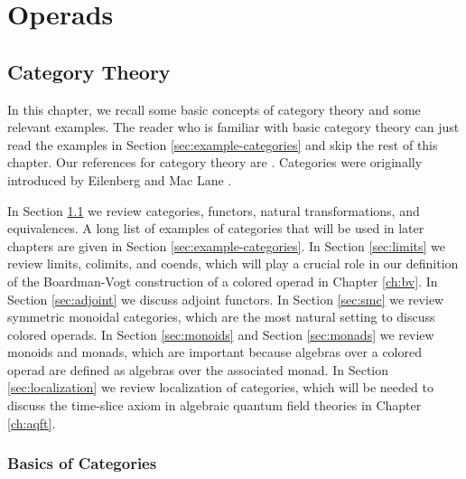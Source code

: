 \documentclass[11pt]{amsbook}
\numberwithin{section}{chapter}
\numberwithin{subsection}{section}
\numberwithin{equation}{section}
\theoremstyle{plain}
\theoremstyle{definition}
\begin{document}
\part{Operads}\label{part:operads}

\chapter{Category Theory}\label{ch:categories}

In this chapter, we recall some basic concepts of category theory and some relevant examples.  The reader who is familiar with basic category theory can just read the examples in Section \ref{sec:example-categories} and skip the rest of this chapter.  Our references for category theory are \cite{bor1,bor2,maclane}.  Categories were originally introduced by Eilenberg and Mac Lane \cite{eilenberg-maclane}.

In Section \ref{sec:categories} we review categories, functors, natural transformations, and equivalences.  A long list of examples of categories that will be used in later chapters are given in Section \ref{sec:example-categories}.  In Section \ref{sec:limits} we review limits, colimits, and coends, which will play a crucial role in our definition of the Boardman-Vogt construction of a colored operad in Chapter \ref{ch:bv}.  In Section \ref{sec:adjoint} we discuss adjoint functors.  In Section \ref{sec:smc} we review symmetric monoidal categories, which are the most natural setting to discuss colored operads.  In Section \ref{sec:monoids} and Section \ref{sec:monads} we review monoids and monads, which are important because algebras over a colored operad are defined as algebras over the associated monad.  In Section \ref{sec:localization} we review localization of categories, which will be needed to discuss the time-slice axiom in algebraic quantum field theories in Chapter \ref{ch:aqft}.

\section{Basics of Categories}\label{sec:categories}
\end{document}
